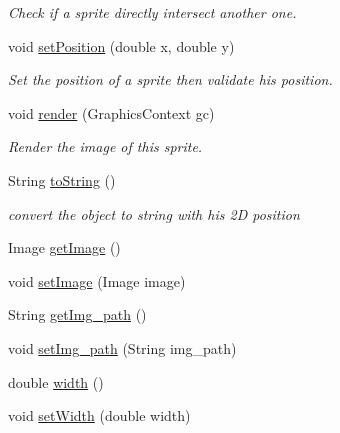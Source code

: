 \begin{DoxyCompactItemize}
\begin{DoxyCompactList}\small\item\em Check if a sprite directly intersect another one. \end{DoxyCompactList}\item 
void \hyperlink{classfr_1_1groupe40_1_1projet_1_1model_1_1_sprite_a12305126f539c9403a9bb03a861aa9c0}{set\+Position} (double x, double y)
\begin{DoxyCompactList}\small\item\em Set the position of a sprite then validate his position. \end{DoxyCompactList}\item 
void \hyperlink{classfr_1_1groupe40_1_1projet_1_1model_1_1_sprite_adaa6c20253be22213e199b90d709f275}{render} (Graphics\+Context gc)
\begin{DoxyCompactList}\small\item\em Render the image of this sprite. \end{DoxyCompactList}\item 
\mbox{\label{classfr_1_1groupe40_1_1projet_1_1model_1_1_sprite_a171e3b2a9d38864f6f4a5fef3e8efe49}} 
String \hyperlink{classfr_1_1groupe40_1_1projet_1_1model_1_1_sprite_a171e3b2a9d38864f6f4a5fef3e8efe49}{to\+String} ()
\begin{DoxyCompactList}\small\item\em convert the object to string with his 2D position \end{DoxyCompactList}\item 
Image \hyperlink{classfr_1_1groupe40_1_1projet_1_1model_1_1_sprite_ae978c58649b232749722a2c2c86e1f0d}{get\+Image} ()
\item 
void \hyperlink{classfr_1_1groupe40_1_1projet_1_1model_1_1_sprite_a79c8fe34e9f81804079ca381b589f6e3}{set\+Image} (Image image)
\item 
String \hyperlink{classfr_1_1groupe40_1_1projet_1_1model_1_1_sprite_a208906f75c02531120b4d0c78c59e7f9}{get\+Img\+\_\+path} ()
\item 
void \hyperlink{classfr_1_1groupe40_1_1projet_1_1model_1_1_sprite_a6d246968ec03152ee63d12696c6cd9a4}{set\+Img\+\_\+path} (String img\+\_\+path)
\item 
double \hyperlink{classfr_1_1groupe40_1_1projet_1_1model_1_1_sprite_a9c9d69c95176ab9663f7b2beb64d6a2d}{width} ()
\item 
void \hyperlink{classfr_1_1groupe40_1_1projet_1_1model_1_1_sprite_a600096893822f1625075033719653eb9}{set\+Width} (double width)

\end{DoxyCompactItemize}
